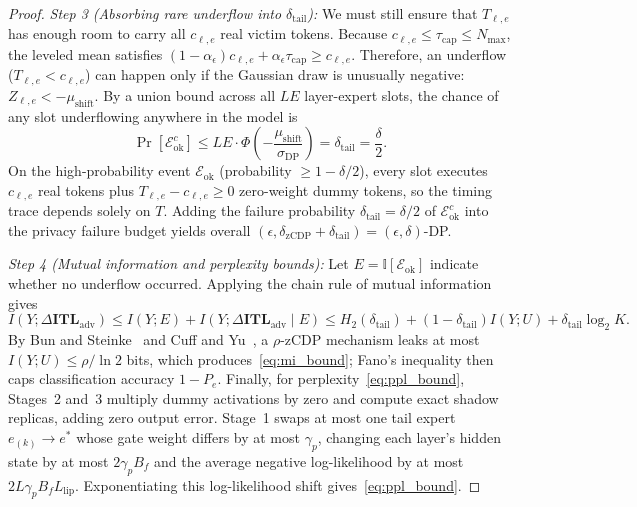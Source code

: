 \documentclass[11pt,a4paper]{article}
\renewcommand{\_}{\textunderscore\allowbreak}
\theoremstyle{definition}
\theoremstyle{remark}
\begin{document}
\begin{proof}
\emph{Step 3 (Absorbing rare underflow into $\delta_{\mathrm{tail}}$):} We must still ensure that $T_{\ell,e}$ has enough room to carry all $c_{\ell,e}$ real victim tokens. Because $c_{\ell,e} \le \tau_{\mathrm{cap}} \le N_{\max}$, the leveled mean satisfies $(1-\alpha_\epsilon)c_{\ell,e} + \alpha_\epsilon\tau_{\mathrm{cap}} \ge c_{\ell,e}$. Therefore, an underflow ($T_{\ell,e} < c_{\ell,e}$) can happen only if the Gaussian draw is unusually negative: $Z_{\ell,e} < -\mu_{\mathrm{shift}}$. By a union bound across all $LE$ layer-expert slots, the chance of any slot underflowing anywhere in the model is
\[
  \Pr[\mathcal{E}_{\mathrm{ok}}^c] \le L E \cdot \Phi\!\left(-\frac{\mu_{\mathrm{shift}}}{\sigma_{\mathrm{DP}}}\right) = \delta_{\mathrm{tail}} = \frac{\delta}{2}.
\]
On the high-probability event $\mathcal{E}_{\mathrm{ok}}$ (probability $\ge 1 - \delta/2$), every slot executes $c_{\ell,e}$ real tokens plus $T_{\ell,e} - c_{\ell,e} \ge 0$ zero-weight dummy tokens, so the timing trace depends solely on $T$. Adding the failure probability $\delta_{\mathrm{tail}} = \delta/2$ of $\mathcal{E}_{\mathrm{ok}}^c$ into the privacy failure budget yields overall $(\epsilon, \delta_{\mathrm{zCDP}} + \delta_{\mathrm{tail}}) = (\epsilon, \delta)$-DP.

\emph{Step 4 (Mutual information and perplexity bounds):} Let $E = \mathbb{I}[\mathcal{E}_{\mathrm{ok}}]$ indicate whether no underflow occurred. Applying the chain rule of mutual information gives
\[
  I(Y; \Delta\mathbf{ITL}_{\mathrm{adv}}) \le I(Y; E) + I(Y; \Delta\mathbf{ITL}_{\mathrm{adv}} \mid E) \le H_2(\delta_{\mathrm{tail}}) + (1-\delta_{\mathrm{tail}}) I(Y; U) + \delta_{\mathrm{tail}}\log_2 K.
\]
By Bun and Steinke~\cite{bun2016zcdp} and Cuff and Yu~\cite{cuff2016dpmi}, a $\rho$-zCDP mechanism leaks at most $I(Y; U) \le \rho / \ln 2$ bits, which produces~\eqref{eq:mi_bound}; Fano's inequality then caps classification accuracy $1 - P_e$. Finally, for perplexity~\eqref{eq:ppl_bound}, Stages~2 and~3 multiply dummy activations by zero and compute exact shadow replicas, adding zero output error. Stage~1 swaps at most one tail expert $e_{(k)} \to e^*$ whose gate weight differs by at most $\gamma_p$, changing each layer's hidden state by at most $2 \gamma_p B_f$ and the average negative log-likelihood by at most $2 L \gamma_p B_f L_{\mathrm{lip}}$. Exponentiating this log-likelihood shift gives~\eqref{eq:ppl_bound}.
\end{proof}

\end{document}
